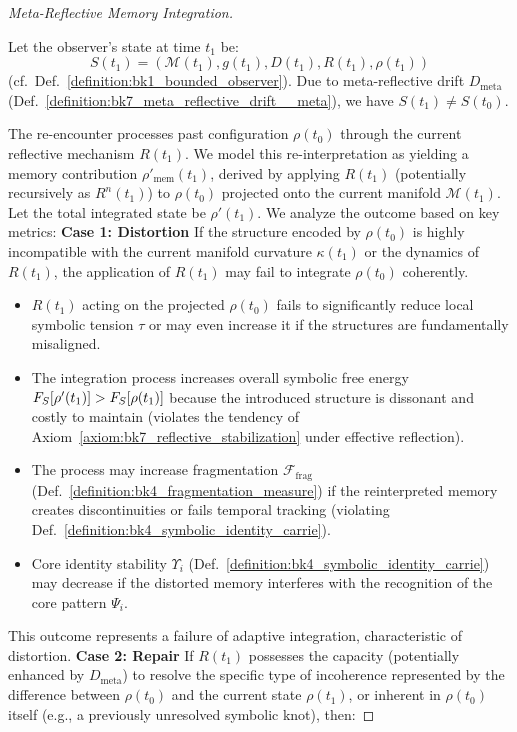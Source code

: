 \begin{proof}[Meta-Reflective Memory Integration]
\label{proof:bk9_meta_reflective_memory_integration}
\leavevmode

Let the observer's state at time $t_1$ be:
\[
S(t_1) = (\mathcal{M}(t_1), g(t_1), D(t_1), R(t_1), \rho(t_1))
\]
(cf.~Def.~\ref{definition:bk1_bounded_observer}). Due to meta-reflective drift $D_{\text{meta}}$ (Def.~\ref{definition:bk7_meta_reflective_drift__meta}), we have $S(t_1) \neq S(t_0)$.

The re-encounter processes past configuration $\rho(t_0)$ through the current reflective mechanism $R(t_1)$. We model this re-interpretation as yielding a memory contribution $\rho'_{\text{mem}}(t_1)$, derived by applying $R(t_1)$ (potentially recursively as $R^n(t_1)$) to $\rho(t_0)$ projected onto the current manifold $\mathcal{M}(t_1)$. Let the total integrated state be $\rho'(t_1)$.
We analyze the outcome based on key metrics:
\textbf{Case 1: Distortion}
If the structure encoded by $\rho(t_0)$ is highly incompatible with the current manifold curvature $\kappa(t_1)$ or the dynamics of $R(t_1)$, the application of $R(t_1)$ may fail to integrate $\rho(t_0)$ coherently.
\begin{itemize}
    \item $R(t_1)$ acting on the projected $\rho(t_0)$ fails to significantly reduce local symbolic tension $\tau$ or may even increase it if the structures are fundamentally misaligned.
    \item The integration process increases overall symbolic free energy $F_S[\rho'(t_1)] > F_S[\rho(t_1)]$ because the introduced structure is dissonant and costly to maintain (violates the tendency of Axiom~\ref{axiom:bk7_reflective_stabilization} under effective reflection).
    \item The process may increase fragmentation $\mathcal{F}_{\text{frag}}$ (Def.~\ref{definition:bk4_fragmentation_measure}) if the reinterpreted memory creates discontinuities or fails temporal tracking (violating Def.~\ref{definition:bk4_symbolic_identity_carrie}).
    \item Core identity stability $\Upsilon_i$ (Def.~\ref{definition:bk4_symbolic_identity_carrie}) may decrease if the distorted memory interferes with the recognition of the core pattern $\Psi_i$.
\end{itemize}
This outcome represents a failure of adaptive integration, characteristic of distortion.
\textbf{Case 2: Repair}
If $R(t_1)$ possesses the capacity (potentially enhanced by $D_{\text{meta}}$) to resolve the specific type of incoherence represented by the difference between $\rho(t_0)$ and the current state $\rho(t_1)$, or inherent in $\rho(t_0)$ itself (e.g., a previously unresolved symbolic knot), then:

\end{proof}
